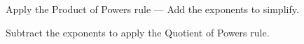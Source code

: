 \documentclass[12pt, a4paper, addpoints]{exam}
\newcommand{\ts}{\vspace{16mm}}
\begin{document}
\begin{questions}

\large

\question Apply the Product of Powers rule — Add the exponents to simplify.

\setlength{\columnsep}{20pt}
\begin{multicols}{6}
\end{multicols}
\ts
\question Subtract the exponents to apply the Quotient of Powers rule.


\end{questions}
\end{document}
